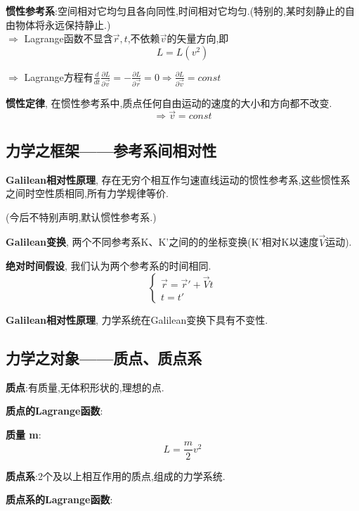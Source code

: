 \documentclass{article}
\newcommand{\defi}[2]{\textbf{#1}, #2}
\begin{document}
        \textbf{惯性参考系}:空间相对它均匀且各向同性,时间相对它均匀.(特别的,某时刻静止的自由物体将永远保持静止.)\\
        $\Rightarrow$ Lagrange函数不显含$\vec r,t$,不依赖$\vec v$的矢量方向,即
            $$L = L(v^2)$$
        
        $\Rightarrow$ Lagrange方程有$\frac{d}{dt}\frac{\partial L}{\partial \vec v} = -\frac{\partial L}{\partial \vec r} = 0 \Rightarrow \frac{\partial L}{\partial \vec v}=const$
        
        \defi{惯性定律}{在惯性参考系中,质点任何自由运动的速度的大小和方向都不改变.}
            $$\Rightarrow \vec v = const$$


    \subsection{力学之框架——参考系间相对性}
        \defi{Galilean相对性原理}{存在无穷个相互作匀速直线运动的惯性参考系,这些惯性系之间时空性质相同,所有力学规律等价.}
        
        (今后不特别声明,默认惯性参考系.)
        
        \defi{Galilean变换}{两个不同参考系K、K'之间的的坐标变换(K'相对K以速度$\vec V$运动).}
        
        \defi{绝对时间假设}{我们认为两个参考系的时间相同.}
            \begin{displaymath}
                \left\{ \begin{array}{ll}
                \vec r = \vec r' + \vec V t\\
                t = t'
                \end{array} \right.
            \end{displaymath}
        
        \defi{Galilean相对性原理}{力学系统在Galilean变换下具有不变性.}
    
    
    \subsection{力学之对象——质点、质点系}
        \textbf{质点}:有质量,无体积形状的,理想的点.
        
        \textbf{质点的Lagrange函数}:
        
        \textbf{质量 m}:
            $$L = \frac{m}{2} v^2$$
        
        \textbf{质点系}:2个及以上相互作用的质点,组成的力学系统.
        
        \textbf{质点系的Lagrange函数}:
        
\end{document}
